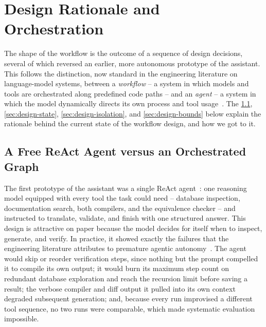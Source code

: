 \section{Design Rationale and Orchestration}
\label{sec:workflow-design}

The shape of the workflow is the outcome of a sequence of design decisions, several of which reversed an earlier, more autonomous prototype of the assistant. This follows the distinction, now standard in the engineering literature on language-model systems, between a \emph{workflow} -- a system in which models and tools are orchestrated along predefined code paths -- and an \emph{agent} -- a system in which the model dynamically directs its own process and tool usage~\cite{anthropicBuildingEffectiveAgents2024}. The \cref{sec:design-agent-vs-graph}, \cref{sec:design-state}, \cref{sec:design-isolation}, and \cref{sec:design-bounds} below explain the rationale behind the current state of the workflow design, and how we got to it.

\subsection{A Free ReAct Agent versus an Orchestrated Graph}
\label{sec:design-agent-vs-graph}

The first prototype of the assistant was a single ReAct agent~\cite{yaoReActSynergizing2023}: one reasoning model equipped with every tool the task could need -- database inspection, documentation search, both compilers, and the equivalence checker -- and instructed to translate, validate, and finish with one structured answer. This design is attractive on paper because the model decides for itself when to inspect, generate, and verify. In practice, it showed exactly the failures that the engineering literature attributes to premature agentic autonomy~\cite{anthropicBuildingEffectiveAgents2024}. The agent would skip or reorder verification steps, since nothing but the prompt compelled it to compile its own output; it would burn its maximum step count on redundant database exploration and reach the recursion limit before saving a result; the verbose compiler and diff output it pulled into its own context degraded subsequent generation; and, because every run improvised a different tool sequence, no two runs were comparable, which made systematic evaluation impossible.

